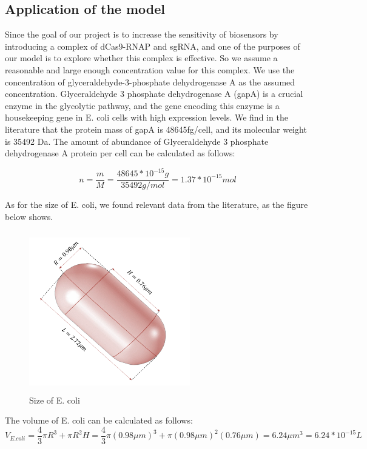 \subsection{Application of the model}
Since the goal of our project is to increase the sensitivity of biosensors by introducing a complex of dCas9-RNAP and sgRNA, and one of the purposes of our model is to explore whether this complex is effective. So we assume a reasonable and large enough concentration value for this complex. We use the concentration of glyceraldehyde-3-phosphate dehydrogenase A as the assumed concentration. Glyceraldehyde 3 phosphate dehydrogenase A (gapA) is a crucial enzyme in the glycolytic pathway, and the gene encoding this enzyme is a housekeeping gene in E. coli cells with high expression levels. We find in the literature that the protein mass of gapA is 48645fg/cell, and its molecular weight is 35492 Da. The amount of abundance of Glyceraldehyde 3 phosphate dehydrogenase A protein per cell can be calculated as follows:

\begin{displaymath}
	n=\frac{m}{M}=\frac{48645*10^{-15}g}{35492g/mol}=1.37*10^{-15}mol
\end{displaymath}

As for the size of E. coli, we found relevant data from the literature, as the figure below shows.

\begin{figure}[!htbp]
	\centering
	\includegraphics[width=7cm,height=7cm]{dc}
	\caption{Size of E. coli}
\end{figure}

The volume of E. coli can be calculated as follows:
\begin{displaymath}
	V_{E.coli}=\frac{4}{3} \pi R^3+\pi R^2H=\frac{4}{3} \pi (0.98\mu m)^3+\pi (0.98\mu m)^2(0.76\mu m)=6.24\mu m^3=6.24*10^{-15}L
\end{displaymath}

